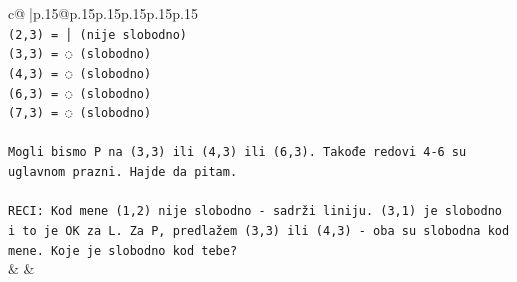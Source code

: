 \documentclass{article}
\begin{document}
{\begin{supertabular}{c@{$\;$}|p{.15\linewidth}@{}p{.15\linewidth}p{.15\linewidth}p{.15\linewidth}p{.15\linewidth}p{.15\linewidth}}
{{{\\ 
\texttt{(2,3) = │ (nije slobodno)} \\
\texttt{(3,3) = ◌ (slobodno)} \\
\texttt{(4,3) = ◌ (slobodno)} \\
\texttt{(6,3) = ◌ (slobodno)} \\
\texttt{(7,3) = ◌ (slobodno)} \\
\\ 
\texttt{Mogli bismo P na (3,3) ili (4,3) ili (6,3). Takođe redovi 4{-}6 su uglavnom prazni. Hajde da pitam.} \\
\\ 
\texttt{RECI: Kod mene (1,2) nije slobodno {-} sadrži liniju. (3,1) je slobodno i to je OK za L. Za P, predlažem (3,3) ili (4,3) {-} oba su slobodna kod mene. Koje je slobodno kod tebe?} \\
            }
        }
    }
    & & \\ \\


\end{supertabular}}
\end{document}
